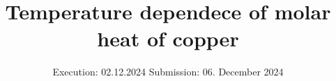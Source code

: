 

\subject{v47}
\title{Temperature dependece of molar heat of copper}
\date{%
  Execution: 02.12.2024
  \hspace{3em}
  Submission: 06. December 2024
}



\maketitle
\thispagestyle{empty}
\tableofcontents
\newpage






\printbibliography{}


